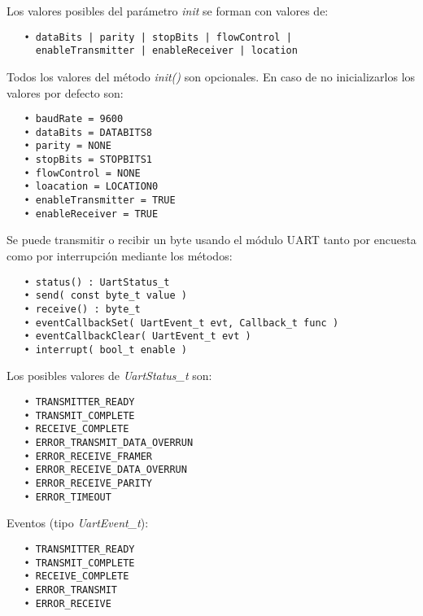 Los valores posibles del parámetro \emph{init} se forman con valores de:

\begin{verbatim}
   • dataBits | parity | stopBits | flowControl |
     enableTransmitter | enableReceiver | location
\end{verbatim}

Todos los valores del método \emph{init()} son opcionales. En caso de no inicializarlos los valores por defecto son:

\begin{verbatim}
   • baudRate = 9600
   • dataBits = DATABITS8
   • parity = NONE
   • stopBits = STOPBITS1
   • flowControl = NONE
   • loacation = LOCATION0
   • enableTransmitter = TRUE
   • enableReceiver = TRUE
\end{verbatim}

Se puede transmitir o recibir un byte usando el módulo UART tanto por encuesta como por interrupción mediante los métodos:

\begin{verbatim}
   • status() : UartStatus_t
   • send( const byte_t value )
   • receive() : byte_t
   • eventCallbackSet( UartEvent_t evt, Callback_t func )
   • eventCallbackClear( UartEvent_t evt )
   • interrupt( bool_t enable )
\end{verbatim}
  
Los posibles valores de \emph{UartStatus\_t} son:


\begin{verbatim}
   • TRANSMITTER_READY
   • TRANSMIT_COMPLETE
   • RECEIVE_COMPLETE
   • ERROR_TRANSMIT_DATA_OVERRUN
   • ERROR_RECEIVE_FRAMER
   • ERROR_RECEIVE_DATA_OVERRUN
   • ERROR_RECEIVE_PARITY
   • ERROR_TIMEOUT
\end{verbatim}

Eventos (tipo \emph{UartEvent\_t}):


\begin{verbatim}
   • TRANSMITTER_READY
   • TRANSMIT_COMPLETE
   • RECEIVE_COMPLETE
   • ERROR_TRANSMIT
   • ERROR_RECEIVE
\end{verbatim}

